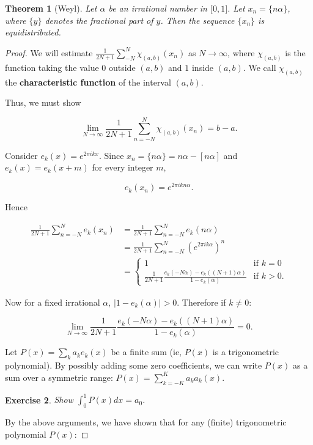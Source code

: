 \documentclass[12pt,letterpaper]{report}
\newcommand\be{\begin{equation}}
\newcommand\ee{\end{equation}}
\newcommand{\tbf}[1]{\textbf{#1}}
\newtheorem{thm}{Theorem}[section]
\newtheorem{exe}[thm]{Exercise}
\begin{document}
\begin{thm}[Weyl]
Let $\alpha$ be an irrational number in $\lbrack 0,1\rbrack$. Let
$x_n = \{n \alpha\}$, where $\{y\}$ denotes the fractional part of
$y$.
 Then the sequence $\{x_n\}$ is equidistributed.
\end{thm}
\begin{proof}
We will estimate $\frac{1}{2 N + 1} \sum_{-N}^N \chi_{(a,b)}(x_n)$
as $N\to \infty$, where $\chi_{(a,b)}$ is the function taking the
value $0$ outside $(a,b)$ and $1$ inside $(a,b)$. We call
$\chi_{(a,b)}$ the \tbf{characteristic function} of the interval
$(a,b)$.

Thus, we must show

\be \lim_{N \rightarrow \infty} \frac{1}{2 N + 1} \sum_{n=-N}^N
\chi_{(a,b)}(x_n) = b-a.\ee

Consider $e_k(x) = e^{2\pi ik x}$. Since $x_n = \{n \alpha\} =
n\alpha - [n \alpha]$ and $e_k(x) = e_k(x+m)$ for every integer
$m$,

\be e_k(x_n) = e^{2\pi ik n\alpha} .\ee

Hence

\be \begin{aligned} \frac{1}{2 N + 1} \sum_{n = -N}^N e_k(x_n) &=
\frac{1}{2 N + 1} \sum_{n=-N}^N e_k(n \alpha)
\\ &= \frac{1}{2 N + 1} \sum_{n = -N}^N (e^{2\pi i k \alpha})^n \\
&= \begin{cases} 1 & \text{if $k=0$} \\ \frac{1}{2 N + 1}
\frac{e_k(-N \alpha) - e_k((N+1) \alpha)}{1 - e_k(\alpha)} &
\text{if $k>0$.}  \end{cases}\end{aligned}  \ee

Now for a fixed irrational $\alpha$, $|1 - e_k(\alpha)| > 0$.
Therefore if $k \neq 0$:

\be \lim_{N\to \infty} \frac{1}{2 N + 1} \frac{e_k(-N \alpha) -
e_k((N+1) \alpha)}{1 - e_k(\alpha)} = 0.\ee

Let $P(x) = \sum_k a_k e_k(x)$ be a finite sum (ie, $P(x)$ is a
trigonometric polynomial). By possibly adding some zero
coefficients, we can write $P(x)$ as a sum over a symmetric range:
$P(x) = \sum_{k=-K}^K a_k a_k(x)$.

\begin{exe} Show $\int_0^1 P(x)dx = a_0$. \end{exe}

By the above arguments, we have shown that for any (finite)
trigonometric polynomial $P(x)$:


\end{proof}
\end{document}
